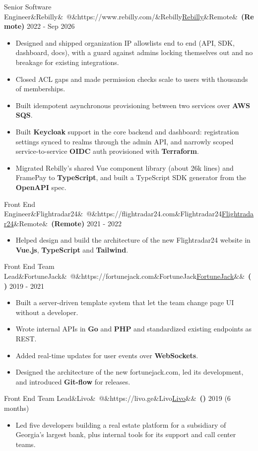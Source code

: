 \documentclass[10pt]{article}
\makeatletter
\newcommand{\weblink}[2]{\href{#1}{\textcolor{linkblue}{\underline{#2}}}}
\newcommand{\role}[5]{%
  \vspace{5pt}\par\noindent
  {\normalsize #1\ifx&#2&\else\ @\ifx&#3&#2\else\weblink{#3}{#2}\fi\fi\ifx&#4&\else\ \textbf{(#4)}\fi}%
  \hfill{\footnotesize #5}\par\nopagebreak\vspace{1pt}}
\makeatother
\begin{document}
\role{Senior Software Engineer}{Rebilly}{https://www.rebilly.com/}{Remote}{2022 - Sep 2026}
\begin{itemize}
  \item Designed and shipped organization IP allowlists end to end (API, SDK, dashboard, docs), with a guard against admins locking themselves out and no breakage for existing integrations.
  \item Closed ACL gaps and made permission checks scale to users with thousands of memberships.
  \item Built idempotent asynchronous provisioning between two services over \textbf{AWS SQS}.
  \item Built \textbf{Keycloak} support in the core backend and dashboard: registration settings synced to realms through the admin API, and narrowly scoped service-to-service \textbf{OIDC} auth provisioned with \textbf{Terraform}.
  \item Migrated Rebilly's shared Vue component library (about 26k lines) and FramePay to \textbf{TypeScript}, and built a TypeScript SDK generator from the \textbf{OpenAPI} spec.
\end{itemize}

\role{Front End Engineer}{Flightradar24}{https://flightradar24.com}{Remote}{2021 - 2022}
\begin{itemize}
  \item Helped design and build the architecture of the new Flightradar24 website in \textbf{Vue.js}, \textbf{TypeScript} and \textbf{Tailwind}.
\end{itemize}

\role{Front End Team Lead}{FortuneJack}{https://fortunejack.com}{}{2019 - 2021}
\begin{itemize}
  \item Built a server-driven template system that let the team change page UI without a developer.
  \item Wrote internal APIs in \textbf{Go} and \textbf{PHP} and standardized existing endpoints as REST.
  \item Added real-time updates for user events over \textbf{WebSockets}.
  \item Designed the architecture of the new fortunejack.com, led its development, and introduced \textbf{Git-flow} for releases.
\end{itemize}

\role{Front End Team Lead}{Livo}{https://livo.ge}{}{2019 (6 months)}
\begin{itemize}
  \item Led five developers building a real estate platform for a subsidiary of Georgia's largest bank, plus internal tools for its support and call center teams.
\end{itemize}
\end{document}
